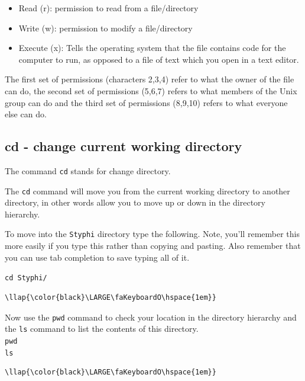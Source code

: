 \documentclass[11pt]{article}
\providecommand{\tightlist}{%
      \setlength{\itemsep}{0pt}\setlength{\parskip}{0pt}}
\begin{document}
\begin{itemize}
\tightlist
\item
  Read (r): permission to read from a file/directory
\item
  Write (w): permission to modify a file/directory
\item
  Execute (x): Tells the operating system that the file contains code
  for the computer to run, as opposed to a file of text which you open
  in a text editor.
\end{itemize}

The first set of permissions (characters 2,3,4) refer to what the owner
of the file can do, the second set of permissions (5,6,7) refers to what
members of the Unix group can do and the third set of permissions
(8,9,10) refers to what everyone else can do.

    \hypertarget{cd---change-current-working-directory}{%
\subsection{cd - change current working
directory}\label{cd---change-current-working-directory}}

The command \texttt{cd} stands for change directory.

The \texttt{cd} command will move you from the current working directory
to another directory, in other words allow you to move up or down in the
directory hierarchy.

To move into the \texttt{Styphi} directory type the following. Note,
you'll remember this more easily if you type this rather than copying
and pasting. Also remember that you can use tab completion to save
typing all of it.

\texttt{cd\ Styphi/}

\begin{terminalinput}
\begin{Verbatim}[commandchars=\\\{\}]
\llap{\color{black}\LARGE\faKeyboardO\hspace{1em}}
\end{Verbatim}
\end{terminalinput}

    Now use the \texttt{pwd} command to check your location in the directory
hierarchy and the \texttt{ls} command to list the contents of this
directory.\\
\texttt{pwd}~\\
\texttt{ls}

\begin{terminalinput}
\begin{Verbatim}[commandchars=\\\{\}]
\llap{\color{black}\LARGE\faKeyboardO\hspace{1em}}
\end{Verbatim}
\end{terminalinput}
\end{document}

